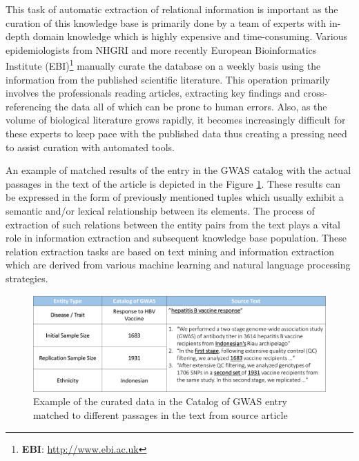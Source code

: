 This task of automatic extraction of relational information is important as the curation of this knowledge base is primarily done by a team of experts with in-depth domain knowledge which is highly expensive and time-consuming. Various epidemiologists from NHGRI and more recently European Bioinformatics Institute (EBI)\footnote{\textbf{EBI}: \url{http://www.ebi.ac.uk}} manually curate the database on a weekly basis using the information from the published scientific literature. This operation primarily involves the professionals reading articles, extracting key findings and cross-referencing the data all of which can be prone to human errors. Also, as the volume of biological literature grows rapidly, it becomes increasingly difficult for these experts to keep pace with the published data thus creating a pressing need to assist curation with automated tools. 

An example of matched results of the entry in the GWAS catalog with the actual passages in the text of the article is depicted in the Figure \ref{figure:problem-example}. These results can be expressed in the form of previously mentioned tuples which usually exhibit a semantic and/or lexical relationship between its elements. The process of extraction of such relations between the entity pairs from the text plays a vital role in information extraction and subsequent knowledge base population. These relation extraction tasks are based on text mining and information extraction which are derived from various machine learning and natural language processing strategies.

\begin{figure}[ht]
    \centering
    \includegraphics[width=0.85\linewidth]{Images/Problem-Example.png}
    \caption{Example of the curated data in the Catalog of GWAS entry matched to different passages in the text from source article}
    \label{figure:problem-example}
    \vspace{0.2in}
\end{figure}

